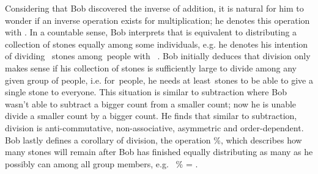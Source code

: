\documentclass[a4paper,10pt]{article}
\newcommand{\three}{{\raisebox{-0.7ex}{\LARGE\starg{e}}}}
\newcommand{\four}{{\raisebox{-0.7ex}{\LARGE\starg{w}}}}
\newcommand{\six}{{\raisebox{-0.7ex}{\LARGE\starg{x}}}}
\newcommand{\seven}{{\raisebox{-0.7ex}{\LARGE\starg{t}}}}
\begin{document}
\begin{flushleft}
{{	Considering that Bob discovered the inverse of addition, it is natural for him to wonder if an inverse operation exists for multiplication; he denotes this operation with {\div}. In a countable sense, Bob interprets that {} is equivalent to distributing a collection of stones equally among some individuals, e.g. he denotes his intention of dividing {\seven\,\three} stones among {\six\;\,}people with {\seven\,\three} {\div} {\six}. Bob initially deduces that division only makes sense if his collection of stones is sufficiently large to divide among any given group of people, i.e. for {\six\;\,}people, he needs at least {\six\;\,}stones to be able to give a single stone to everyone. This situation is similar to subtraction where Bob wasn't able to subtract a bigger count from a smaller count; now he is unable divide a smaller count by a bigger count. He finds that similar to subtraction, division is anti-commutative, non-associative, asymmetric and order-dependent. Bob lastly defines a corollary of division, the {} operation {\%}, which describes how many stones will remain after Bob has finished equally distributing as many as he possibly can among all group members, e.g. {\seven\,\three} {\%} {\six} = {\four}. 
	\linebreak\linebreak
	}}
	\textbf{\Large{}}\linebreak\linebreak

\end{flushleft}
\end{document}
